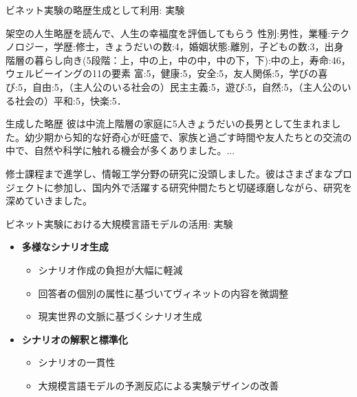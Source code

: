 \documentclass{beamer}
\begin{document}
    \begin{frame}{ビネット実験の略歴生成として利用}{\secname : 実験}
    \begin{block}{架空の人生略歴を読んで、人生の幸福度を評価してもらう}
    性別:男性，業種:テクノロジー，学歴:修士，きょうだいの数:4，婚姻状態:離別，子どもの数:3，出身階層の暮らし向き(5段階：上，中の上，中の中，中の下，下):中の上，寿命:46，ウェルビーイングの11の要素 富:5，健康:5，安全:5，友人関係:5，学びの喜び:5，自由:5，（主人公のいる社会の）民主主義:5，遊び:5，自然:5，（主人公のいる社会の）平和:5，快楽:5．        
    \end{block}
    \pause
    \begin{block}{生成した略歴}
    彼は中流上階層の家庭に5人きょうだいの長男として生まれました。幼少期から知的な好奇心が旺盛で、家族と過ごす時間や友人たちとの交流の中で、自然や科学に触れる機会が多くありました。...
    
    修士課程まで進学し、情報工学分野の研究に没頭しました。彼はさまざまなプロジェクトに参加し、国内外で活躍する研究仲間たちと切磋琢磨しながら、研究を深めていきました。
    \end{block}
    
    \end{frame}

    \begin{frame}{ビネット実験における大規模言語モデルの活用}{\secname : 実験}
    \begin{itemize}
        \item \textbf{多様なシナリオ生成}
        \begin{itemize}
            \item シナリオ作成の負担が大幅に軽減
            \item 回答者の個別の属性に基づいてヴィネットの内容を微調整
            \item 現実世界の文脈に基づくシナリオ生成
        \end{itemize}
        \pause
        \item \textbf{シナリオの解釈と標準化}
        \begin{itemize}
            \item シナリオの一貫性
            \item 大規模言語モデルの予測反応による実験デザインの改善
        \end{itemize}
    \end{itemize}
    \end{frame}

\end{document}
